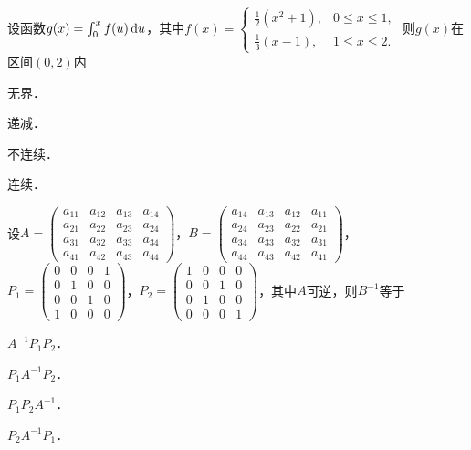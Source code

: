 \documentclass[plain,noanswer,medmath]{../../template/jnuexam}
\begin{document}
\begin{problem}
设函数$g(x) = \int_0^x f(u)\mathop{}\!\mathrm{d} u$，其中$f(x) = \begin{cases}
  \frac{1}{2}(x^2 + 1), & 0 \le x \le 1, \\
    \frac{1}{3}(x - 1), & 1 \le x \le 2.
\end{cases}$ 则$g(x)$在区间$(0,2)$内\pickout{}
\begin{abcd}
\item 无界．
\item 递减．
\item 不连续．
\item 连续．
\end{abcd}
\end{problem}


\begin{problem}
设$A = \begin{pmatrix}
  a_{11} & a_{12} & a_{13} & a_{14} \\
  a_{21} & a_{22} & a_{23} & a_{24} \\
  a_{31} & a_{32} & a_{33} & a_{34} \\
  a_{41} & a_{42} & a_{43} & a_{44}
\end{pmatrix}$，$B = \begin{pmatrix}
  a_{14} & a_{13} & a_{12} & a_{11} \\
  a_{24} & a_{23} & a_{22} & a_{21} \\
  a_{34} & a_{33} & a_{32} & a_{31} \\
  a_{44} & a_{43} & a_{42} & a_{41}
\end{pmatrix}$，$P_1 = \begin{pmatrix}
  0 & 0 & 0 & 1 \\
  0 & 1 & 0 & 0 \\
  0 & 0 & 1 & 0 \\
  1 & 0 & 0 & 0
\end{pmatrix}$，\goodbreak $P_2 = \begin{pmatrix}
  1 & 0 & 0 & 0 \\
  0 & 0 & 1 & 0 \\
  0 & 1 & 0 & 0 \\
  0 & 0 & 0 & 1
\end{pmatrix}$，其中$A$可逆，则$B^{-1}$等于\pickout{}
\begin{abcd}
\item $A^{-1}P_1P_2$．
\item $P_1A^{-1}P_2$．
\item $P_1P_2A^{-1}$．
\item $P_2A^{-1}P_1$．
\end{abcd}
\end{problem}
\end{document}
